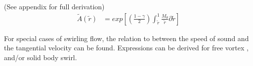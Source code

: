 
(See appendix for full derivation)
\begin{align*}
\tilde{A}(\tilde{r}) &= exp\left[\left(\frac{1 - \gamma}{2}\right)\int_{\tilde{r}}^{1}\frac{M_{\theta}}{\tilde{r}}{\partial \tilde{r}}\right]	
\end{align*}

For special cases of swirling flow, the relation to between the speed 
of sound and the tangential velocity can be found. Expressions can be derived 
for free vortex , and/or solid body swirl. 


